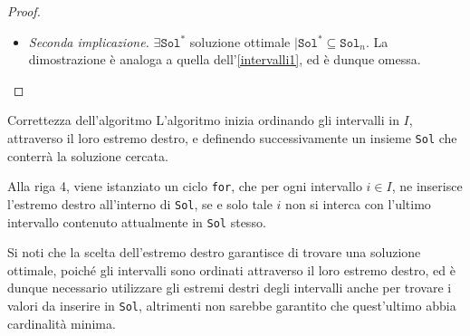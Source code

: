 \documentclass[a4paper, 12pt]{report}
\begin{document}
\begin{proof}
\begin{itemize}
\begin{itemize}
                    \item sia $j \in [1, n) \mid x \in [a_j, b_j]$; allora, si verifica uno dei seguenti casi:
                        \begin{itemize}
                            \item $j \le k \implies \exists \hat x \in \texttt{Sol}_k \mid \hat x \in [a_j, b_j]$ poiché doveva essere già stato analizzato dall'algoritmo
                            \item $j > k + 1 \implies b_j > b_{k +1}$; si noti inoltre che l'intervallo $[a_j, b_j]$ è stato scelto tale che $x \in [a_j, b_j]$, e poiché $x \in [a_{k +1}, b_{k +1}]$ per sua definizione, si verifica necessariamente che $$\left .\begin{array}{r} x \in [a_j , b_j] \cap [a_{k + 1}, b_{k +1}] \neq \varnothing \\ b_j > b_{k +1} \end{array} \right \} \implies a_j \le x \le b_{k +1} \le b_j$$ in particolare, si noti che $b_{k +1} \in [a_j, b_j]$, e poiché la dimostrazione non dipende dalla scelta di $x \in \texttt{Sol}^* - \texttt{Sol}_k$, né da $j \in [1, n)$, si ha che $b_{k +1}$ copre ogni intervallo coperto da $x$; allora, per far si che esista soluzione ottimale $\texttt{Sol}^*$ tale da contenere $\texttt{Sol}_{k +1} = \texttt{Sol}_k \cup \{b_{k +1}\}$, è sufficiente considerare $$(\texttt{Sol}^* - \{x\}) \cup \{b_{k +1}\}$$
                        \end{itemize}
                \end{itemize}
            \item[] \textit{Seconda implicazione.} $\exists \texttt{Sol}^*$ soluzione ottimale $\mid \texttt{Sol}^* \subseteq \texttt{Sol}_n$. La dimostrazione è analoga a quella dell'\cref{intervalli1}, ed è dunque omessa.
        \end{itemize}
    \end{proof}

    \begin{framedobs}{Correttezza dell'algoritmo}
        L'algoritmo inizia ordinando gli intervalli in $I$, attraverso il loro estremo destro, e definendo successivamente un insieme \texttt{Sol} che conterrà la soluzione cercata.

        Alla riga 4, viene istanziato un ciclo \texttt{for}, che per ogni intervallo $i \in I$, ne inserisce l'estremo destro all'interno di \texttt{Sol}, se e solo tale $i$ non si interca con l'ultimo intervallo contenuto attualmente in \texttt{Sol} stesso.

        Si noti che la scelta dell'estremo destro garantisce di trovare una soluzione ottimale, poiché gli intervalli sono ordinati attraverso il loro estremo destro, ed è dunque necessario utilizzare gli estremi destri degli intervalli anche per trovare i valori da inserire in \texttt{Sol}, altrimenti non sarebbe garantito che quest'ultimo abbia cardinalità minima.
    \end{framedobs}
\end{document}
